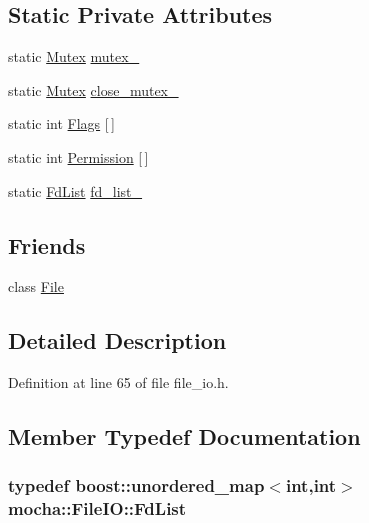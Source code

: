 \subsection*{Static Private Attributes}
\begin{DoxyCompactItemize}
\item 
static \hyperlink{classmocha_1_1_mutex}{Mutex} \hyperlink{classmocha_1_1_file_i_o_a014c87164371f39709fb815d3a126fcc}{mutex\_\-}
\item 
static \hyperlink{classmocha_1_1_mutex}{Mutex} \hyperlink{classmocha_1_1_file_i_o_a978cc0713eb0a1a87420e46083df8a15}{close\_\-mutex\_\-}
\item 
static int \hyperlink{classmocha_1_1_file_i_o_a260815d39f51399859e9a86d744e742d}{Flags} \mbox{[}$\,$\mbox{]}
\item 
static int \hyperlink{classmocha_1_1_file_i_o_aaa0202a641bdb6fa70456cd4947f748c}{Permission} \mbox{[}$\,$\mbox{]}
\item 
static \hyperlink{classmocha_1_1_file_i_o_a82c5c99d9000ae1e0795338dcdd9364d}{FdList} \hyperlink{classmocha_1_1_file_i_o_ab3c13d85dbbf8a8c6c98864af6c57958}{fd\_\-list\_\-}
\end{DoxyCompactItemize}
\subsection*{Friends}
\begin{DoxyCompactItemize}
\item 
class \hyperlink{classmocha_1_1_file_i_o_a68d15876ad188b7628261b12d0eac8aa}{File}
\end{DoxyCompactItemize}


\subsection{Detailed Description}


Definition at line 65 of file file\_\-io.h.



\subsection{Member Typedef Documentation}
\hypertarget{classmocha_1_1_file_i_o_a82c5c99d9000ae1e0795338dcdd9364d}{
\subsubsection[{FdList}]{\setlength{\rightskip}{0pt plus 5cm}typedef boost::unordered\_\-map$<$int,int$>$ {\bf mocha::FileIO::FdList}}}
\label{classmocha_1_1_file_i_o_a82c5c99d9000ae1e0795338dcdd9364d}


